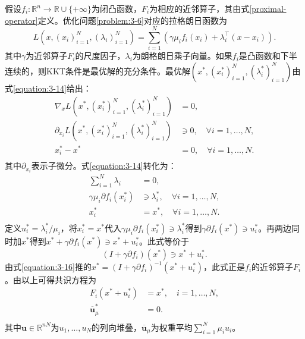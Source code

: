 假设$f_i\colon\mathbb{R}^n\to\mathbb{R}\cup\{+\infty\}$为闭凸函数，$F_i$为相应的近邻算子，其由式\eqref{proximal-operator}定义。优化问题\eqref{problem:3-6}对应的拉格朗日函数为
\begin{equation} \label{equation:3-13}
	L(x,(x_i)_{i=1}^N,(\lambda_i)_{i=1}^N)=\sum_{i=1}^{N}(\gamma\mu_{i}f_i(x_i)+\lambda_i^\top(x-x_i)).
\end{equation}
其中$\gamma$为近邻算子$F_i$的尺度因子，$\lambda_i$为朗格朗日乘子向量。如果$f_i$是凸函数和下半连续的，则KKT条件是最优解的充分条件。最优解$(x^*,(x_i^*)_{i=1}^N,(\lambda_i^*)_{i=1}^N)$由式\eqref{equation:3-14}给出：
\begin{equation} \label{equation:3-14}
	\begin{aligned}
 		\nabla_x{L(x^*,(x_i^*)_{i=1}^N,(\lambda_i^*)_{i=1}^N)}&=0, \\
		\partial_{x_i}{L(x^*,(x_i^*)_{i=1}^N,(\lambda_i^*)_{i=1}^N)}&\ni{0},\quad\forall{i=1,\ldots,N}, \\
		x_i^*-x^*&=0,\quad\forall{i=1,\ldots,N}. \\
	\end{aligned}
\end{equation}
其中$\partial_{x_i}$表示子微分。式\eqref{equation:3-14}转化为：
\begin{equation} \label{equation:3-15}
	\begin{aligned}
		\sum_{i=1}^{N}\lambda_i&=0, \\
		\gamma\mu_i\partial{f_i(x_i^*)}&\ni{\lambda_i^*},\quad\forall{i=1,\ldots,N}, \\
		x_i^*&=x^*,\quad\forall{i=1,\ldots,N}. \\
	\end{aligned}
\end{equation}
定义$u_i^*=\lambda_i^*/\mu_i$，将$x_i^*=x^*$代入$\gamma\mu_i\partial{f_i(x_i^*)}\ni{\lambda_i^*}$得到$\gamma\partial{f_i(x^*)}\ni{u_i^*}$。再两边同时加$x^*$得到$x^*+\gamma\partial{f_i(x^*)}\ni{x^*+u_i^*}$。此式等价于
\begin{equation} \label{equation:3-16}
	(I+\gamma\partial{f_i})(x^*)\ni{x^*+u_i^*}.
\end{equation}
由式\eqref{equation:3-16}推的$x^*=(I+\gamma\partial{f_i})^{-1}(x^*+u_i^*)$，此式正是$f_i$的近邻算子$F_i$。由以上可得共识方程为
\begin{equation} \label{equation:ce}
	\begin{aligned}
		F_i(x^*+u_i^*)&=x^*,\quad{i=1,\ldots,N,} \\
		\overline{\mathbf{u}}_\mu^*&=0. \\
	\end{aligned}
\end{equation}
其中$\mathbf{u}\in\mathbb{R}^{nN}$为$u_1,\ldots,u_N$的列向堆叠，$\overline{\mathbf{u}}_\mu$为权重平均$\sum_{i=1}^{N}\mu_i{u_i}$。

